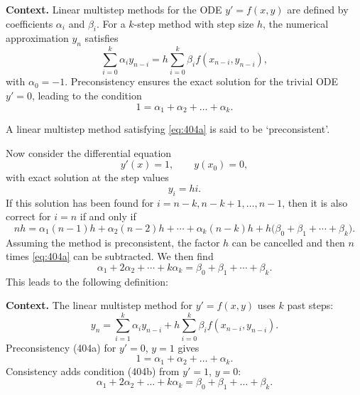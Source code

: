\noindent\textbf{Context.}
Linear multistep methods for the ODE $y' = f(x,y)$ are defined by coefficients $\alpha_i$ and $\beta_i$. For a $k$-step method with step size $h$, the numerical approximation $y_n$ satisfies
\[
\sum_{i=0}^k \alpha_i y_{n-i} = h \sum_{i=0}^k \beta_i f(x_{n-i}, y_{n-i}),
\]
with $\alpha_0 = -1$. Preconsistency ensures the exact solution for the trivial ODE $y'=0$, leading to the condition
\begin{equation}
\label{404a}
1 = \alpha_1 + \alpha_2 + \dots + \alpha_k.
\end{equation}

\begin{definition}[preconsistent (404A)]

  \label{def:404A}
  \uses{}
A linear multistep method satisfying \eqref{eq:404a} is said to be `preconsistent'.

Now consider the differential equation
\[
y'(x) = 1, \qquad y(x_0) = 0,
\]
with exact solution at the step values
\[
y_i = hi.
\]
If this solution has been found for $i = n - k, n - k + 1, \dots, n - 1$, then it is also correct for $i = n$ if and only if
\[
nh = \alpha_1 (n-1)h + \alpha_2 (n-2)h + \cdots + \alpha_k (n-k)h + h \bigl( \beta_0 + \beta_1 + \cdots + \beta_k \bigr).
\]
Assuming the method is preconsistent, the factor $h$ can be cancelled and then $n$ times \eqref{eq:404a} can be subtracted. We then find
\[
\alpha_1 + 2\alpha_2 + \cdots + k\alpha_k = \beta_0 + \beta_1 + \cdots + \beta_k. \tag{404b}
\]
This leads to the following definition:
\end{definition}

\noindent\textbf{Context.}
The linear multistep method for $y'=f(x,y)$ uses $k$ past steps:
\[
y_n = \sum_{i=1}^k \alpha_i y_{n-i} + h\sum_{i=0}^k \beta_i f(x_{n-i},y_{n-i}).
\]
Preconsistency (404a) for $y'=0$, $y=1$ gives
\[
1 = \alpha_1 + \alpha_2 + \dots + \alpha_k.
\]
Consistency adds condition (404b) from $y'=1$, $y=0$:
\[
\alpha_1 + 2\alpha_2 + \dots + k\alpha_k = \beta_0 + \beta_1 + \dots + \beta_k.
\]

